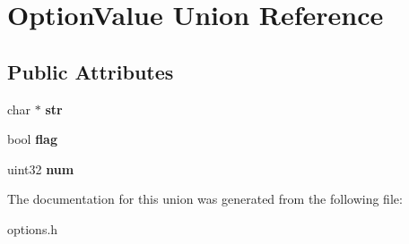 \hypertarget{unionOptionValue}{
\section{OptionValue Union Reference}
\label{unionOptionValue}
}
\subsection*{Public Attributes}
\begin{DoxyCompactItemize}
\item 
\hypertarget{unionOptionValue_a80ecb0b3cfc92d6b6d4fdf1d958a6017}{
char $\ast$ {\bfseries str}}
\label{unionOptionValue_a80ecb0b3cfc92d6b6d4fdf1d958a6017}

\item 
\hypertarget{unionOptionValue_a755d65b9d23c7e92f1168787208a4f51}{
bool {\bfseries flag}}
\label{unionOptionValue_a755d65b9d23c7e92f1168787208a4f51}

\item 
\hypertarget{unionOptionValue_aef8f2590401c87928a7565885e3633fc}{
uint32 {\bfseries num}}
\label{unionOptionValue_aef8f2590401c87928a7565885e3633fc}

\end{DoxyCompactItemize}


The documentation for this union was generated from the following file:\begin{DoxyCompactItemize}
\item 
options.h\end{DoxyCompactItemize}
